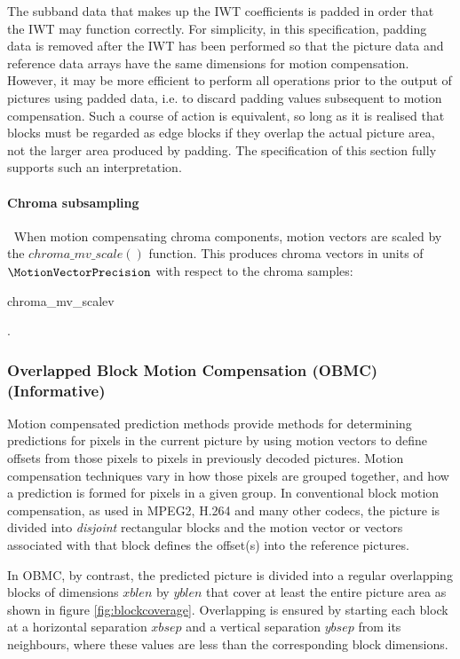 \begin{informative}
The subband data that makes up the IWT coefficients is padded in order that the IWT
may function correctly. For simplicity, in this specification, padding data is removed
after the IWT has been performed so that the picture data and reference data arrays have
the same dimensions for motion compensation. However, it may be more efficient to perform
all operations prior to the output of pictures using padded data, i.e. to discard padding values
subsequent to motion compensation. Such a course of action is equivalent, so long as it is realised
that blocks must be regarded as edge blocks if they overlap the actual picture area, not the
larger area produced by padding. The specification of this section fully supports such an 
interpretation.
\end{informative}

\paragraph{Chroma subsampling}
\label{chromamvscale}
$\ $\newline
When motion compensating chroma components, motion vectors are scaled by the
$chroma\_mv\_scale()$ function. This produces chroma vectors in units of 
$\MotionVectorPrecision$ with respect to the chroma samples:

\begin{pseudo}{chroma\_mv\_scale}{v}
\end{pseudo}.

\begin{informative*}
\subsubsection{Overlapped Block Motion Compensation (OBMC) (Informative)}

Motion compensated prediction methods provide methods for determining 
predictions for pixels in the current picture by using motion vectors to 
define offsets from those pixels to pixels in previously decoded
pictures. Motion compensation techniques vary in how those pixels are grouped
together, and how a prediction is formed for pixels in a given group. In 
conventional  block motion compensation, as used in MPEG2, H.264 and many other
codecs, the picture is divided into {\em disjoint} rectangular blocks and the
motion vector or vectors associated with that block defines the offset(s) into
the reference pictures.

In OBMC, by contrast, the predicted picture is divided into a regular overlapping 
blocks of dimensions $xblen$ by $yblen$ that cover at least the entire picture 
area as shown in figure \ref{fig:blockcoverage}.  Overlapping is ensured by starting
each block at a horizontal separation $xbsep$ and a vertical separation $ybsep$ 
from its neighbours, where these values are less than the corresponding block dimensions.
\end{informative*}

